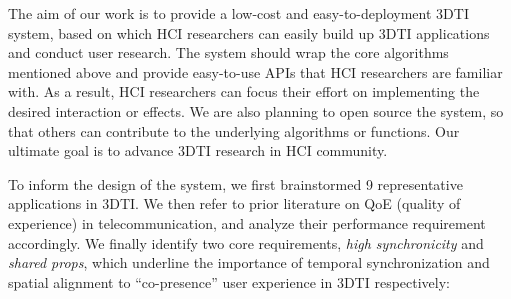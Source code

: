 

The aim of our work is to provide a low-cost and easy-to-deployment 3DTI system, based on which HCI researchers can easily build up 3DTI applications and conduct user research. The system should wrap the core algorithms mentioned above and provide easy-to-use APIs that HCI researchers are familiar with. As a result, HCI researchers can focus their effort on implementing the desired interaction or effects. We are also planning to open source the system, so that others can contribute to the underlying algorithms or functions. Our ultimate goal is to advance 3DTI research in HCI community. 

To inform the design of the system, we first brainstormed 9 representative applications in 3DTI. We then refer to prior literature on QoE (quality of experience) in telecommunication, and analyze their performance requirement accordingly. We finally identify two core requirements, \textit{high synchronicity} and \textit{shared props}, which underline the importance of temporal synchronization and spatial alignment to ``co-presence'' user experience in 3DTI respectively: 

